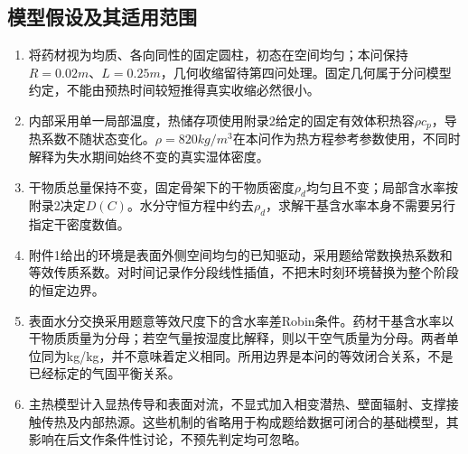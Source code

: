 \subsection{模型假设及其适用范围}
\begin{enumerate}[label=（\arabic*）]
\item 将药材视为均质、各向同性的固定圆柱，初态在空间均匀；本问保持$R=0.02\unit{m}$、$L=0.25\unit{m}$，几何收缩留待第四问处理。固定几何属于分问模型约定，不能由预热时间较短推得真实收缩必然很小。
\item 内部采用单一局部温度，热储存项使用附录2给定的固定有效体积热容$\rho c_p$，导热系数不随状态变化。$\rho=820\unit{kg/m^3}$在本问作为热方程参考参数使用，不同时解释为失水期间始终不变的真实湿体密度。
\item 干物质总量保持不变，固定骨架下的干物质密度$\rho_d$均匀且不变；局部含水率按附录2决定$D(C)$。水分守恒方程中约去$\rho_d$，求解干基含水率本身不需要另行指定干密度数值。
\item 附件1给出的环境是表面外侧空间均匀的已知驱动，采用题给常数换热系数和等效传质系数。对时间记录作分段线性插值，不把末时刻环境替换为整个阶段的恒定边界。
\item 表面水分交换采用题意等效尺度下的含水率差Robin条件。药材干基含水率以干物质质量为分母；若空气量按湿度比解释，则以干空气质量为分母。两者单位同为kg/kg，并不意味着定义相同。所用边界是本问的等效闭合关系，不是已经标定的气固平衡关系。
\item 主热模型计入显热传导和表面对流，不显式加入相变潜热、壁面辐射、支撑接触传热及内部热源。这些机制的省略用于构成题给数据可闭合的基础模型，其影响在后文作条件性讨论，不预先判定均可忽略。
\end{enumerate}

